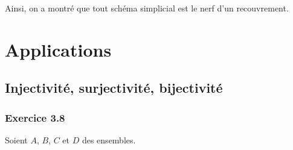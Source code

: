 \documentclass[a4paper,french,bookmarks]{article}
\begin{document}
    Ainsi, on a montré que tout schéma simplicial est le nerf d'un recouvrement.

    \section{Applications}

    \subsection{Injectivité, surjectivité, bijectivité}

    \subsubsection*{Exercice 3.8}
    
    Soient $A$, $B$, $C$ et $D$ des ensembles. 
    
\end{document}
